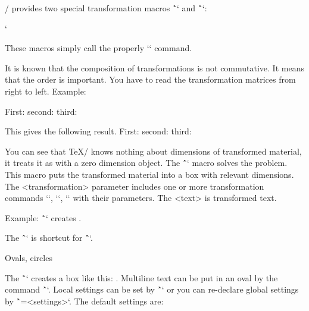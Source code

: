 {\OpTeX/ provides two special transformation macros
\^`\pdfscale` and \^`\pdfrotate`:

\begtt \catcode`
\endtt

These macros simply call the properly `\pdfsetmatrix` command.

It is known that the composition of transformations is not commutative. It
means that the order is important. You have to read the transformation
matrices from right to left. Example:

\begtt
First: \pdfsave {}\pdfrestore
second: \pdfsave {}\pdfrestore
third: \pdfsave {}%
       \pdfrestore %
\endtt
%
\par\nobreak\bigskip\smallskip
This gives the following result.
First: \pdfsave {}\pdfrestore
second: \pdfsave {}\pdfrestore
third: \pdfsave {}\pdfrestore
\par\nobreak\bigskip{}%

You can see that \TeX/ knows nothing about dimensions of transformed material,
it treats it as with a zero dimension object.
\new
The \^``
macro solves the problem. This macro puts the transformed
material into a box with relevant dimensions. The <transformation> parameter
includes one or more transformation commands `\pdfsetmatrix`, `\pdfscale`,
`\pdfrotate` with their parameters. The <text> is transformed text.

Example: \~``
creates .

The \^`` is shortcut for
\^``.

\secc Ovals, circles

\new
The \^`` creates a box like this: .
Multiline text can be put in an oval by the command \^``.
Local settings can be set by
\^`` or you can re-declare global settings by
\^`\ovalparams={<settings>}`. The default settings are:

}
